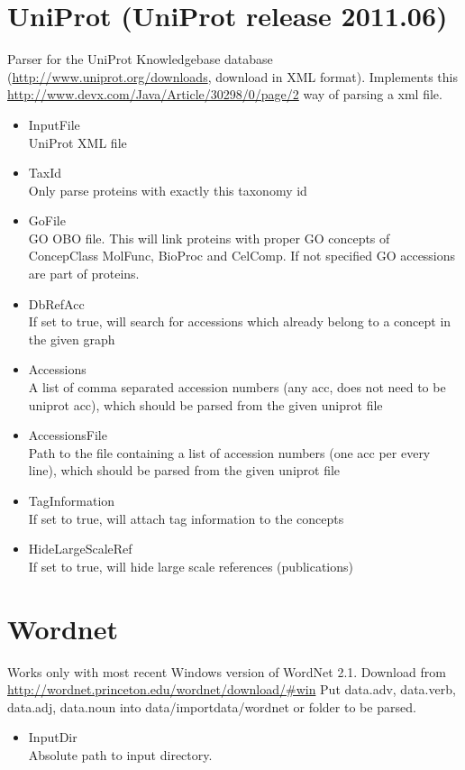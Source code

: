 \section{UniProt (UniProt release 2011.06)}
Parser for the UniProt Knowledgebase database (\url{http://www.uniprot.org/downloads}, download in XML format). 
Implements this \url{http://www.devx.com/Java/Article/30298/0/page/2} way of parsing a xml file.

\begin{itemize}
  \item{InputFile}\\
  UniProt XML file 
  \item{TaxId}\\
  Only parse proteins with exactly this taxonomy id
  \item{GoFile}\\
  GO OBO file. This will link proteins with proper GO concepts of ConcepClass MolFunc, BioProc and CelComp. 
  If not specified GO accessions are part of proteins.
  \item{DbRefAcc}\\
  If set to true, will search for accessions which already belong to a concept in the given graph
  \item{Accessions}\\
  A list of comma separated accession numbers (any acc, does not need to be uniprot acc), which should be parsed from the given uniprot file
  \item{AccessionsFile}\\
  Path to the file containing a list of accession numbers (one acc per every line), which should be parsed from the given uniprot file	
  \item{TagInformation}\\
  If set to true, will attach tag information to the concepts
  \item{HideLargeScaleRef}\\
  If set to true, will hide large scale references (publications)
\end{itemize}

\section{Wordnet}
Works only with most recent Windows version of WordNet 2.1.
Download from \url{http://wordnet.princeton.edu/wordnet/download/#win}
Put data.adv, data.verb, data.adj, data.noun into data/importdata/wordnet or folder to be parsed.
\begin{itemize}
  \item{InputDir}\\
  Absolute path to input directory.  
\end{itemize}
